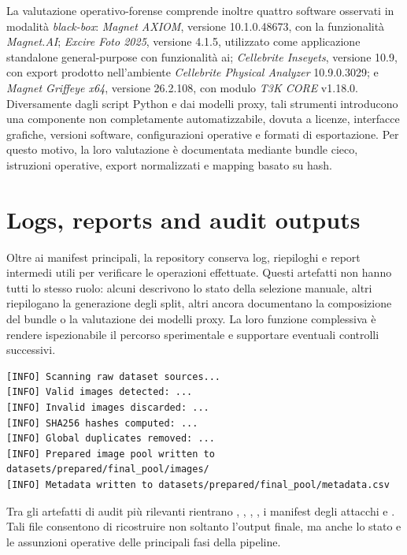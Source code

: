 La valutazione operativo-forense comprende inoltre quattro software osservati
in modalità \textit{black-box}: \textit{Magnet AXIOM}, versione
10.1.0.48673, con la funzionalità \textit{Magnet.AI};
\textit{Excire Foto 2025}, versione 4.1.5, utilizzato come applicazione
standalone general-purpose con funzionalità \gls{ai}; \textit{Cellebrite
Inseyets}, versione 10.9, con export prodotto nell'ambiente \textit{Cellebrite
Physical Analyzer} 10.9.0.3029; e \textit{Magnet Griffeye x64}, versione
26.2.108, con modulo \textit{T3K CORE} v1.18.0. Diversamente dagli script
Python e dai modelli proxy, tali strumenti introducono una componente non
completamente automatizzabile, dovuta a licenze, interfacce grafiche, versioni
software, configurazioni operative e formati di esportazione. Per questo motivo,
la loro valutazione è documentata mediante bundle cieco, istruzioni operative,
export normalizzati e mapping basato su hash.

\section{Logs, reports and audit outputs}
\label{app:logs-reports-audit-outputs}

Oltre ai manifest principali, la repository conserva log, riepiloghi e report intermedi utili per verificare le operazioni effettuate. Questi artefatti non hanno tutti lo stesso ruolo: alcuni descrivono lo stato della selezione manuale, altri riepilogano la generazione degli split, altri ancora documentano la composizione del bundle o la valutazione dei modelli proxy. La loro funzione complessiva è rendere ispezionabile il percorso sperimentale e supportare eventuali controlli successivi.

\begin{lstlisting}[caption={Esempio schematico di output della fase di preparazione del dataset.}, label={lst:dataset-preparation-log}]
[INFO] Scanning raw dataset sources...
[INFO] Valid images detected: ...
[INFO] Invalid images discarded: ...
[INFO] SHA256 hashes computed: ...
[INFO] Global duplicates removed: ...
[INFO] Prepared image pool written to datasets/prepared/final_pool/images/
[INFO] Metadata written to datasets/prepared/final_pool/metadata.csv
\end{lstlisting}

Tra gli artefatti di audit più rilevanti rientrano , , , , i manifest degli attacchi e . Tali file consentono di ricostruire non soltanto l'output finale, ma anche lo stato e le assunzioni operative delle principali fasi della pipeline.

